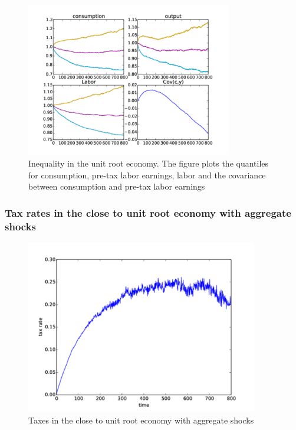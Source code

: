 \documentclass{beamer}
\begin{document}
\begin{frame}
  \begin{figure}[htp]
 \centering
 \includegraphics[width=0.8\textwidth]{Images/near_unit_quant.pdf}
 \caption{Inequality in the unit root  economy. The figure plots the quantiles for consumption, pre-tax labor earnings, labor and the covariance between consumption and pre-tax labor earnings}
 \label{fig:quant_pers}
 \end{figure}
\end{frame}


\begin{frame}
\frametitle {Tax rates in the close to unit root economy with aggregate shocks}

  \begin{figure}[htp]
 \centering
 \includegraphics[width=0.9\textwidth]{Images/near_unit_agg.pdf}
 \caption{Taxes in the close to unit root economy with aggregate shocks }
 \label{fig:taxes_plots}
 \end{figure}
\end{frame}
\end{document}
